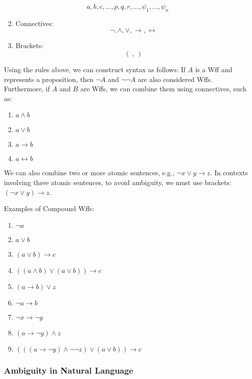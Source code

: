 \documentclass[12pt,a4paper,openany]{article}
\begin{document}
\[
a, b, c, \ldots, p, q, r, \ldots, \psi_1, \ldots, \psi_n
\]

\begin{enumerate}
\setcounter{enumi}{1}
\item Connectives:
\[
\lnot, \land, \lor, \rightarrow, \leftrightarrow
\]
\item Brackets:
\[
( \ , \ )
\]
\end{enumerate}

Using the rules above, we can construct syntax as follows:  
If \(A\) is a Wff and represents a proposition, then \(\lnot A\) and \(\lnot\lnot A\) are also considered Wffs. Furthermore, if \(A\) and \(B\) are Wffs, we can combine them using connectives, such as:

\begin{enumerate}
\item \(a \land b\)
\item \(a \lor b\)
\item \(a \rightarrow b\)
\item \(a \leftrightarrow b\)
\end{enumerate}

We can also combine two or more atomic sentences, e.g., \(\lnot x \lor y \rightarrow z\). In contexts involving three atomic sentences, to avoid ambiguity, we must use brackets: \((\lnot x \lor y) \rightarrow z\).

Examples of Compound Wffs:

\begin{enumerate}
\item \(\lnot a\)
\item \(a \lor b\)
\item \((a \lor b) \rightarrow c\)
\item \(((a \land b) \lor (a \lor b)) \rightarrow c\)
\item \((a \rightarrow b) \lor z\)
\item \(\lnot a \rightarrow b\)
\item \(\lnot x \rightarrow \lnot y\)
\item \((a \rightarrow \lnot y) \land z\)
\item \((((a \rightarrow \lnot y) \land \lnot\lnot z) \lor (a \lor b)) \rightarrow c\)
\end{enumerate}

\subsubsection{Ambiguity in Natural Language}
\end{document}
